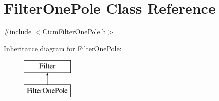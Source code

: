 \hypertarget{class_filter_one_pole}{\section{Filter\-One\-Pole Class Reference}
\label{class_filter_one_pole}
}


{\ttfamily \#include $<$Cicm\-Filter\-One\-Pole.\-h$>$}

Inheritance diagram for Filter\-One\-Pole\-:\begin{figure}[H]
\begin{center}
\leavevmode
\includegraphics[height=2.000000cm]{class_filter_one_pole}
\end{center}
\end{figure}

